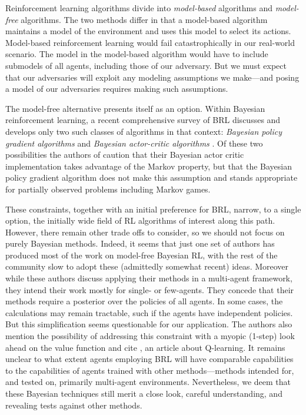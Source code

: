\documentclass{article}
\begin{document}
Reinforcement learning algorithms divide into \emph{model-based}
algorithms and \emph{model-free} algorithms.  The two methods differ
in that a model-based algorithm maintains a model of the environment
and uses this model to select its actions.  Model-based reinforcement
learning would fail catastrophically in our real-world scenario.  The
model in the model-based algorithm would have to include submodels of
all agents, including those of our adversary.  But we must expect that
our adversaries will exploit any modeling assumptions we make---and
posing a model of our adversaries requires making such assumptions.

The model-free alternative presents itself as an option.  Within
Bayesian reinforcement learning, a recent comprehensive survey of BRL
\cite{ghavamzadeh2016bayesian} discusses and develops only two such
classes of algorithms in that context: \emph{Bayesian policy gradient
  algorithms} \cite{engel2007bayesian, ghavamzadeh2016abayesian} and
\emph{Bayesian actor-critic algorithms} \cite{ghavamzadeh2007bayesian,
  ghavamzadeh2016abayesian}.  Of these two possibilities the authors
of \cite{ghavamzadeh2016bayesian} caution that their Bayesian actor
critic implementation takes advantage of the Markov property, but that
the Bayesian policy gradient algorithm does not make this assumption
and stands appropriate for partially observed problems including
Markov games.

These constraints, together with an initial preference for BRL,
narrow, to a single option, the initially wide field of RL algorithms
of interest along this path.  However, there remain other trade offs
to consider, so we should not focus on purely Bayesian methods.
Indeed, it seems that just one set of authors has produced most of the
work on model-free Bayesian RL, with the rest of the community slow to
adopt these (admittedly somewhat recent) ideas.  Moreover while these
authors discuss applying their methods in a multi-agent framework,
they intend their work mostly for single- or few-agents.  They concede
that their methods require a posterior over the policies of all
agents.  In some cases, the calculations may remain tractable, such if
the agents have independent policies.  But this simplification seems
questionable for our application.  The authors also mention the
possibility of addressing this constraint with a myopic (1-step) look
ahead on the value function and cite \cite{dearden1998bayesian}, an
article about Q-learning.  It remains unclear to what extent agents
employing BRL will have comparable capabilities to the capabilities of
agents trained with other methods---methods intended for, and tested
on, primarily multi-agent environments.  Nevertheless, we deem that
these Bayesian techniques still merit a close look, careful
understanding, and revealing tests against other methods.
\end{document}
